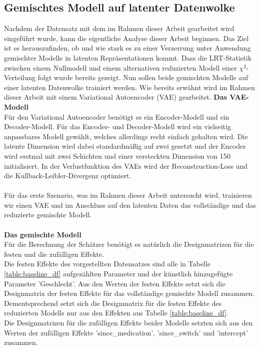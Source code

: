 \documentclass[%
thesis=student,%
coverpage=false,%
titlepage=false,%
headmarks=true, %
german,%
font=libertine, %
math=newpxtx, %
BCOR=5mm,%
coverBCOR=11mm%
]{tumbook}
\theoremstyle{break}
\begin{document}
\subsection{Gemischtes Modell auf latenter Datenwolke}
Nachdem der Datensatz mit dem im Rahmen dieser Arbeit gearbeitet wird eingeführt wurde, kann die eigentliche Analyse dieser Arbeit beginnen. Das Ziel ist es herauszufinden, ob und wie stark es zu einer Verzerrung unter Anwendung gemischter Modelle in latenten Repräsentationen kommt. Dass die LRT-Statistik zwischen einem Nullmodell und einem alternativen reduzierten Modell einer $\chi^2$-Verteilung folgt wurde bereits gezeigt. Nun sollen beide gemischten Modelle auf einer latenten Datenwolke trainiert werden. Wie bereits erwähnt wird im Rahmen dieser Arbeit mit einem Variational Autoencoder (VAE) gearbeitet.
\textbf{Das VAE-Modell}\\
Für den Variational Autoencoder benötigt es ein Encoder-Modell und ein Decoder-Modell. Für das Encoder- und Decoder-Modell wird ein vielseitig anpassbares Modell gewählt, welches allerdings recht einfach gehalten wird. Die latente Dimension wird dabei standardmäßig auf zwei gesetzt und der Encoder wird erstmal mit zwei Schichten und einer versteckten Dimension von 150 initialisiert. In der Verlustfunktion des VAEs wird der Reconstruction-Loss und die Kullback-Leibler-Divergenz optimiert. \\
\\
Für das erste Szenario, was im Rahmen dieser Arbeit untersucht wird, trainieren wir einen VAE und im Anschluss auf den latenten Daten das vollständige und das reduzierte gemischte Modell. \\
\\
\textbf{Das gemischte Modell}\\
Für die Berechnung der Schätzer benötigt es natürlich die Designmatrizen für die festen und die zufälligen Effekte. \\
Die festen Effekte des vorgestellten Datensatzes sind alle in Tabelle \ref{table:baseline_df} aufgezählten Parameter und der künstlich hinzugefügte Parameter 'Geschlecht'. Aus den Werten der festen Effekte setzt sich die Designmatrix der festen Effekte für das vollständige gemischte Modell zusammen. Dementsprechend setzt sich die Designmatrix für die festen Effekte des reduzierten Modells nur aus den Effekten aus Tabelle \ref{table:baseline_df}.\\
Die Designmatrizen für die zufälligen Effekte beider Modelle setzten sich aus den Werten der zufälligen Effekte 'since\_medication', 'since\_switch' und 'intercept' zusammen.\\ 
\end{document}
